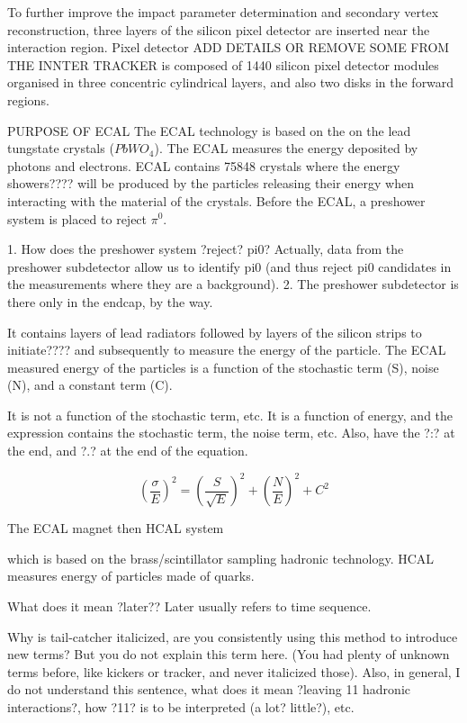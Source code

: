 To further improve the impact parameter determination and secondary vertex reconstruction, three layers of the silicon pixel detector are inserted near the interaction region. Pixel detector ADD DETAILS OR REMOVE SOME FROM THE INNTER TRACKER is composed of 1440 silicon pixel detector modules organised in three concentric cylindrical layers, and also two disks in the forward regions. 


PURPOSE OF ECAL The ECAL technology is based on the on the lead tungstate crystals ($PbWO_4$). The ECAL measures the energy deposited by photons and electrons. ECAL contains 75848 crystals where the energy showers???? will be produced by the particles releasing their energy when interacting with the material of the crystals. Before the ECAL, a preshower system is placed to reject $\pi^0$. 

1. How does the preshower system ?reject? pi0?  Actually, data from the preshower subdetector allow us to identify pi0 (and thus reject pi0 candidates in the measurements where they are a background).
2. The preshower subdetector is there only in the endcap, by the way. 


It contains layers of lead radiators followed by layers of the silicon strips to initiate???? and subsequently to measure the energy of the particle. The ECAL measured energy of the particles is a function of the stochastic term (S), noise (N), and a constant term (C). 

It is not a function of the stochastic term, etc. It is a function of energy, and the expression contains the stochastic term, the noise term, etc.
  Also, have the ?:? at the end, and ?.? at the end of the equation. 
  
  
\begin{equation}
  \left(\frac{\sigma}{E}\right)^2 = \left(\frac{S}{\sqrt{E}}\right)^2 +
  \left(\frac{N}{E}\right)^2 + C^2
  \label{eq:ecal}
\end{equation}

The ECAL 
magnet
then
HCAL system

 which is based on the brass/scintillator sampling hadronic technology. HCAL measures energy of particles made of quarks. 
 
 What does it mean ?later?? Later usually refers to time sequence.

Why is tail-catcher italicized, are you consistently using this method to introduce new terms? But you do not explain this term here. (You had plenty of unknown terms before, like kickers or tracker, and never italicized those).
   Also, in general, I do not understand this sentence, what does it mean ?leaving 11 hadronic interactions?, how ?11? is to be interpreted (a lot? little?), etc. 
   
